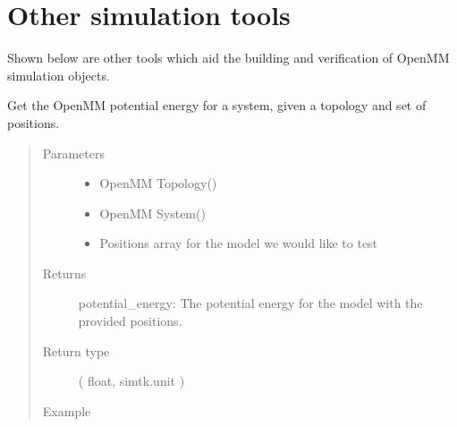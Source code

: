 \documentclass[letterpaper,12pt,english,openany,oneside]{sphinxmanual}
\begin{document}
\section{Other simulation tools}
\label{\detokenize{simulation:other-simulation-tools}}
Shown below are other tools which aid the building and verification of OpenMM simulation objects.

\label{\detokenize{simulation:module-simulation.tools}}

\begin{fulllineitems}
\label{\detokenize{simulation:simulation.tools.get_mm_energy}}
Get the OpenMM potential energy for a system, given a topology and set of positions.
\begin{quote}\begin{description}
\item[{Parameters}] \leavevmode\begin{itemize}
\item {} 
 \textendash{} OpenMM Topology()

\item {} 
 \textendash{} OpenMM System()

\item {} 
 \textendash{} Positions array for the model we would like to test

\end{itemize}

\item[{Returns}] \leavevmode
potential\_energy: The potential energy for the model with the provided positions.

\item[{Return type}] \leavevmode

 ( float, simtk.unit )


\item[{Example}] \leavevmode
\end{description}\end{quote}


\end{fulllineitems}
\end{document}
